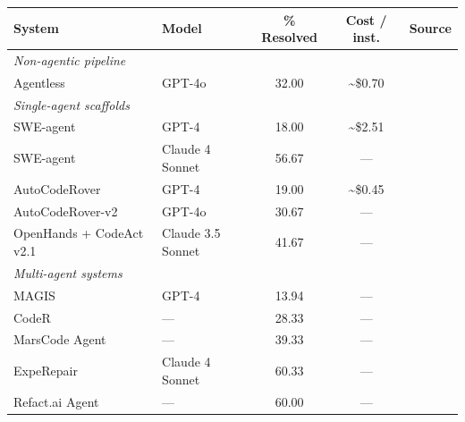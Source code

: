 %
%
%
\begin{tabular}{llccl}
\toprule
System & Model & \% Resolved & Cost / inst. & Source \\
\midrule
\multicolumn{5}{l}{\emph{Non-agentic pipeline}} \\
Agentless            & GPT-4o                & 32.00 & \textasciitilde\$0.70 & \cite{xia2024agentless} \\
\midrule
\multicolumn{5}{l}{\emph{Single-agent scaffolds}} \\
SWE-agent            & GPT-4                 & 18.00 & \textasciitilde\$2.51 & \cite{yang2024sweagent} \\
SWE-agent            & Claude 4 Sonnet       & 56.67 & ---                   & \cite{swebenchleaderboard} \\
AutoCodeRover        & GPT-4                 & 19.00 & \textasciitilde\$0.45 & \cite{zhang2024autocoderover} \\
AutoCodeRover-v2     & GPT-4o                & 30.67 & ---                   & \cite{swebenchleaderboard} \\
OpenHands + CodeAct v2.1 & Claude 3.5 Sonnet & 41.67 & ---                   & \cite{wang2024openhands,swebenchleaderboard} \\
\midrule
\multicolumn{5}{l}{\emph{Multi-agent systems}} \\
MAGIS                & GPT-4                 & 13.94 & ---                   & \cite{tao2024magis} \\
CodeR                & ---                   & 28.33 & ---                   & \cite{swebenchleaderboard} \\
MarsCode Agent       & ---                   & 39.33 & ---                   & \cite{swebenchleaderboard} \\
ExpeRepair           & Claude 4 Sonnet       & 60.33 & ---                   & \cite{swebenchleaderboard} \\
Refact.ai Agent      & ---                   & 60.00 & ---                   & \cite{swebenchleaderboard} \\
\bottomrule
\end{tabular}
